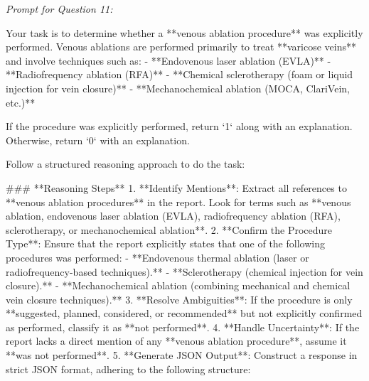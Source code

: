 \textit{\normalsize Prompt for Question  11:}
\begin{mdframed}[]
\normalsize

Your task is to determine whether a **venous ablation procedure** was explicitly performed. Venous ablations are performed primarily to treat **varicose veins** and involve techniques such as:  
- **Endovenous laser ablation (EVLA)**  
- **Radiofrequency ablation (RFA)**  
- **Chemical sclerotherapy (foam or liquid injection for vein closure)**  
- **Mechanochemical ablation (MOCA, ClariVein, etc.)**  

If the procedure was explicitly performed, return `1` along with an explanation. Otherwise, return `0` with an explanation.

Follow a structured reasoning approach to do the task:

### **Reasoning Steps**  
1. **Identify Mentions**: Extract all references to **venous ablation procedures** in the report. Look for terms such as **venous ablation, endovenous laser ablation (EVLA), radiofrequency ablation (RFA), sclerotherapy, or mechanochemical ablation**.  
2. **Confirm the Procedure Type**: Ensure that the report explicitly states that one of the following procedures was performed:  
   - **Endovenous thermal ablation (laser or radiofrequency-based techniques).**  
   - **Sclerotherapy (chemical injection for vein closure).**  
   - **Mechanochemical ablation (combining mechanical and chemical vein closure techniques).**  
3. **Resolve Ambiguities**: If the procedure is only **suggested, planned, considered, or recommended** but not explicitly confirmed as performed, classify it as **not performed**.  
4. **Handle Uncertainty**: If the report lacks a direct mention of any **venous ablation procedure**, assume it **was not performed**.  
5. **Generate JSON Output**: Construct a response in strict JSON format, adhering to the following structure:  

\end{mdframed}

